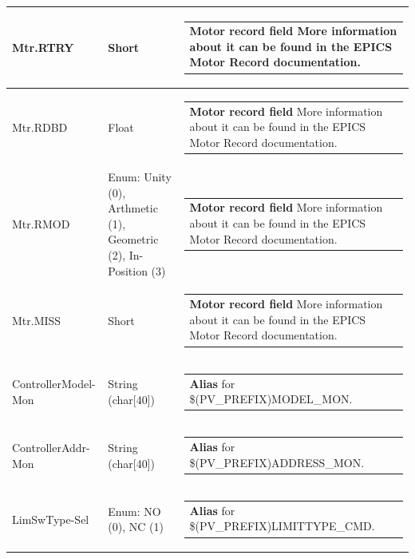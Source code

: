 \documentclass[openany]{article}
\begin{document}
\begin{longtable}{| m{4.5cm} m{2.5cm}  m{8.5cm} |}
        Mtr.RTRY & Short & \begin{tabular}{@{}m{6cm}@{}}
                \textbf{\color{ForestGreen} Motor record field} More information about it can be found in the EPICS Motor Record documentation.
            \end{tabular} \hypertarget{pv:mtr-rdbd}{}\\ \hline
        Mtr.RDBD & Float & \begin{tabular}{@{}m{6cm}@{}}
                \textbf{\color{ForestGreen} Motor record field} More information about it can be found in the EPICS Motor Record documentation.
            \end{tabular} \hypertarget{pv:mtr-rmod}{}\\ \hline
        Mtr.RMOD & Enum: Unity (0), Arthmetic (1), Geometric (2), In-Position (3) & \begin{tabular}{@{}m{6cm}@{}}
                \textbf{\color{ForestGreen} Motor record field} More information about it can be found in the EPICS Motor Record documentation.
            \end{tabular} \hypertarget{pv:mtr-miss}{}\\ \hline
        Mtr.MISS & Short & \begin{tabular}{@{}m{6cm}@{}}
                \textbf{\color{ForestGreen} Motor record field} More information about it can be found in the EPICS Motor Record documentation.
            \end{tabular} \hypertarget{pv:controller-model-mon}{}\\ \hline
        ControllerModel-Mon & String (char[40]) & \begin{tabular}{@{}m{6cm}@{}}
                \textbf{\color{blue} Alias} for \$(PV\_PREFIX)MODEL\_MON.
            \end{tabular} \hypertarget{pv:controller-addr-mon}{}\\ \hline
        ControllerAddr-Mon & String (char[40]) & \begin{tabular}{@{}m{6cm}@{}}
                \textbf{\color{blue} Alias} for \$(PV\_PREFIX)ADDRESS\_MON.
            \end{tabular} \hypertarget{pv:lim-sw-type}{}\\ \hline
        LimSwType-Sel & Enum: NO (0), NC (1) & \begin{tabular}{@{}m{6cm}@{}}
                \textbf{\color{blue} Alias} for \$(PV\_PREFIX)LIMITTYPE\_CMD.

\end{tabular}
\end{longtable}
\end{document}
